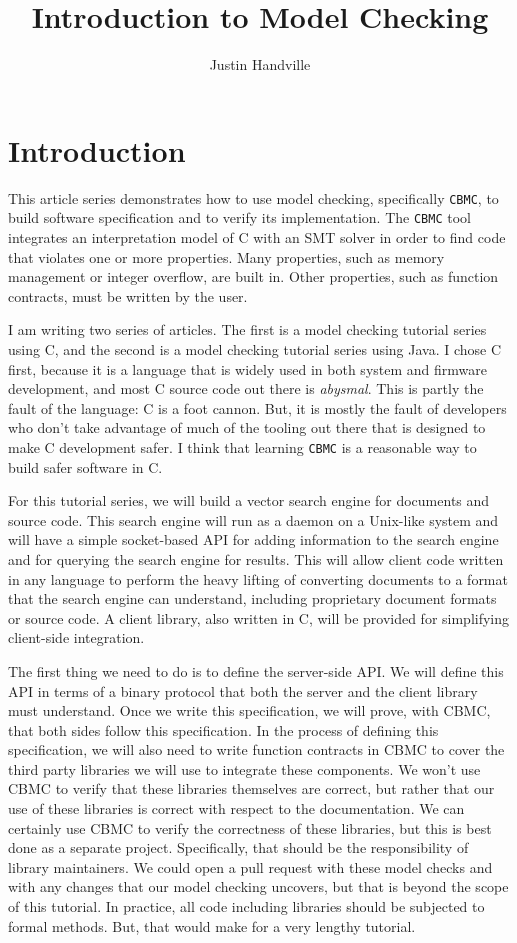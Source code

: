 \title{Introduction to Model Checking}
\author{Justin Handville}

\section{Introduction}

This article series demonstrates how to use model checking, specifically
\verb/CBMC/, to build software specification and to verify its implementation.
The \verb/CBMC/ tool integrates an interpretation model of C with an SMT solver
in order to find code that violates one or more properties.  Many properties,
such as memory management or integer overflow, are built in.  Other properties,
such as function contracts, must be written by the user.

I am writing two series of articles.  The first is a model checking tutorial
series using C, and the second is a model checking tutorial series using Java. I
chose C first, because it is a language that is widely used in both system and
firmware development, and most C source code out there is \emph{abysmal}. This
is partly the fault of the language: C is a foot cannon. But, it is mostly the
fault of developers who don't take advantage of much of the tooling out there
that is designed to make C development safer. I think that learning \verb/CBMC/
is a reasonable way to build safer software in C.

For this tutorial series, we will build a vector search engine for documents and
source code.  This search engine will run as a daemon on a Unix-like system and
will have a simple socket-based API for adding information to the search engine
and for querying the search engine for results.  This will allow client code
written in any language to perform the heavy lifting of converting documents to
a format that the search engine can understand, including proprietary document
formats or source code.  A client library, also written in C, will be provided
for simplifying client-side integration.

The first thing we need to do is to define the server-side API.  We will define
this API in terms of a binary protocol that both the server and the client
library must understand.  Once we write this specification, we will prove, with
CBMC, that both sides follow this specification.  In the process of defining
this specification, we will also need to write function contracts in CBMC to
cover the third party libraries we will use to integrate these components. We
won't use CBMC to verify that these libraries themselves are correct, but rather
that our use of these libraries is correct with respect to the documentation. We
can certainly use CBMC to verify the correctness of these libraries, but this is
best done as a separate project.  Specifically, that should be the
responsibility of library maintainers.  We could open a pull request with these
model checks and with any changes that our model checking uncovers, but that is
beyond the scope of this tutorial.  In practice, all code including libraries
should be subjected to formal methods.  But, that would make for a very lengthy
tutorial.

